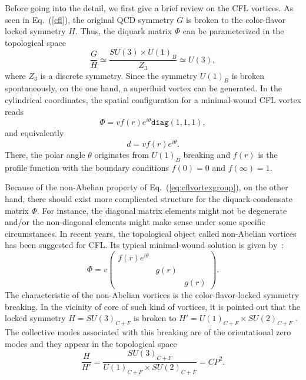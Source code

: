 \documentclass[12pt]{article}
\begin{document}
Before going into the detail, we first give a brief review on the CFL vortices.
As seen in Eq.~(\ref{cfl}), the original QCD symmetry $G$ is broken to
the color-flavor locked symmetry $H$.
Thus, the diquark matrix $\Phi$ can be parameterized in the
topological space
\begin{equation}
  \label{eq:cflvortexgroup}
  \frac{G}{H} \simeq \frac{SU(3) \times U(1)_B}{Z_3}  \simeq U(3),
\end{equation}
where $Z_3$ is a discrete symmetry.
Since the symmetry $U(1)_B$ is broken spontaneously, on the one hand, a superfluid vortex can be generated.
In the cylindrical coordinates, the spatial configuration for a minimal-wound CFL vortex reads
\begin{equation}
  \label{eq:bvortexphi}
\Phi =vf(r)e^{i \theta} \texttt{diag}(1,1,1),
\end{equation}
and equivalently
\begin{equation}
 d = vf(r)e^{i\theta}. \label{eq:bvortex}\end{equation}
There, the polar angle $\theta$ originates from $U(1)_B$ breaking and
$f(r)$ is the profile function with the boundary
conditions $f(0) = 0$ and $f(\infty) =1$.

Because of the non-Abelian property of Eq.~(\ref{eq:cflvortexgroup}), on the other hand,
there should exist more complicated structure for the diquark-condensate matrix $\Phi$.
For instance, the diagonal matrix elements might not be degenerate and/or the non-diagonal
elements might make sense under some specific circumstances.
In recent years, the topological object called non-Abelian vortices has been suggested for
CFL. Its typical minimal-wound solution is given
by~\cite{balachandran2006semisuperfluid,nakano2008non,eto2009color}:
\begin{equation}
  \label{eq:nvortex}
  \Phi = v\begin{pmatrix}
   f(r)e^{i\theta} & & \\ & g(r) & \\ & & g(r)
  \end{pmatrix}.
\end{equation}
The characteristic of the non-Abelian vortices is the color-flavor-locked symmetry breaking.
In the vicinity of core of such kind of vortices, it is pointed out that the locked symmetry $H={SU(3)_{C+F}}$ is broken to
$H' =U(1)_{C+F} \times SU(2)_{C+F}$ \cite{nakano2008non,vinci2012spontaneous}.
The collective modes associated with this breaking are of the orientational zero modes and they appear in the
topological space
\begin{equation}
  \label{eq:cp2}
 \frac{H}{H'} = \frac{SU(3)_{C+F}}{U(1)_{C+F} \times SU(2)_{C+F}} = CP^2.
\end{equation}
\end{document}
